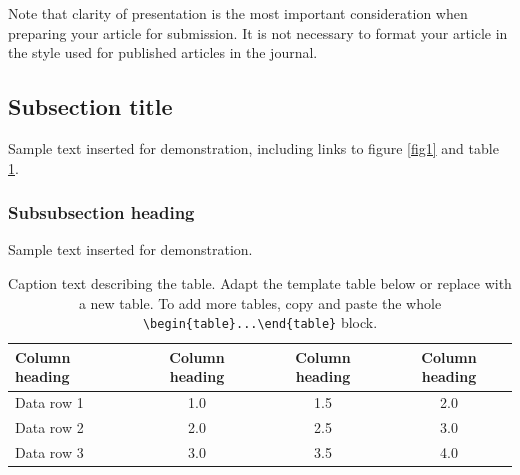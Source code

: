 \documentclass{iopjournal}
\begin{document}
Note that clarity of presentation is the most important consideration when preparing your article for submission. It is not necessary to format your article in the style used for published articles in the journal.

\subsection{Subsection title}
Sample text inserted for demonstration, including links to figure \ref{fig1} and table \ref{tab1}.

\subsubsection{Subsubsection heading}
Sample text inserted for demonstration.



\begin{table}
\caption{Caption text describing the table. Adapt the template table below or replace with a new table. To add more tables, copy and paste the whole {\tt \textbackslash begin\{table\}...\textbackslash end\{table\}} block.}
\centering
\begin{tabular}{l c c c}
\hline
Column heading & Column heading & Column heading & Column heading \\
\hline
Data row 1 & 1.0 & 1.5 & 2.0 \\
Data row 2 & 2.0 & 2.5 & 3.0 \\
Data row 3 & 3.0 & 3.5 & 4.0 \\
\hline
\end{tabular}
\label{tab1}
\end{table}

%
%
\end{document}
